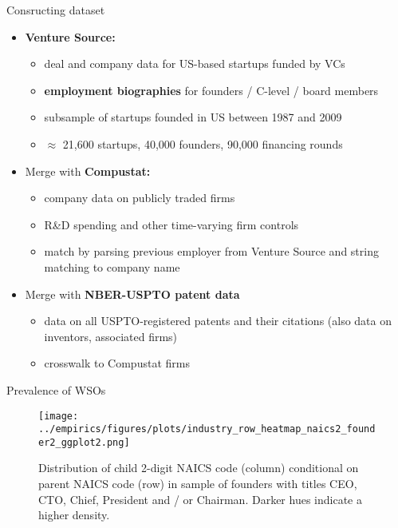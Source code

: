 \documentclass[english,usenames,dvipsnames]{beamer}
\begin{document}
\begin{frame}{Consructing dataset}
	\begin{itemize}
		\item<+-> \alert{\textbf{Venture Source:}} 
		\begin{itemize}
			\item deal and company data for US-based startups funded by VCs
			\item \alert{\textbf{employment biographies}} for founders / C-level / board members
			\item subsample of startups founded in US between 1987 and 2009
			\item $\approx$ 21,600 startups, 40,000 founders, 90,000 financing rounds
		\end{itemize}
		\medskip
		\item<+-> Merge with \alert{\textbf{Compustat:}}
		\begin{itemize}
			\item company data on publicly traded firms 
			\item R\&D spending and other time-varying firm controls
			\item match by parsing previous employer from Venture Source and string matching to company name
		\end{itemize}
		\medskip
		\item<+-> Merge with \alert{\textbf{NBER-USPTO patent data}}
		\begin{itemize}
			\item data on all USPTO-registered patents and their citations (also data on inventors, associated firms)
			\item crosswalk to Compustat firms
		\end{itemize}
	\end{itemize}
\end{frame}

\begin{frame}{Prevalence of WSOs}
	\begin{figure}[]
		\centering
		\texttt{[image: ../empirics/figures/plots/industry\_row\_heatmap\_naics2\_founder2\_ggplot2.png]}
		\caption{Distribution of child 2-digit NAICS code (column) conditional on parent NAICS code (row) in sample of founders with titles CEO, CTO, Chief, President and / or Chairman. Darker hues indicate a higher density.}
		\label{figure:industry_row_heatmap_naics2_founder2}
	\end{figure}
\end{frame}
\end{document}

